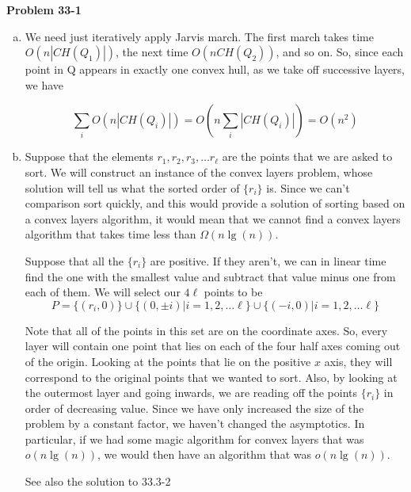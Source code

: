 \documentclass{article}
\begin{document}
\noindent\textbf{Problem 33-1}\\
\begin{enumerate}[a.]
\item
We need just iteratively apply Jarvis march. The first march takes time $O(n|CH(Q_1)|)$, the next time $O(nCH(Q_2))$, and so on. So, since each point in Q appears in exactly one convex hull, as we take off successive layers, we have

\[
\sum_{i} O(n|CH(Q_i)|) = O(n \sum_{i} |CH(Q_i)|) = O(n^2)
\]
\item

Suppose that the elements $r_1,r_2, r_3, \ldots r_\ell$ are the points that we are asked to sort. We will construct an instance of the convex layers problem, whose solution will tell us what the sorted order of $\{r_i\}$ is. Since we can't comparison sort quickly, and this would provide a solution of sorting based on a convex layers algorithm, it would mean that we cannot find a convex layers algorithm that takes time less than $\Omega(n\lg(n))$.

Suppose that all the $\{r_i\}$ are positive. If they aren't, we can in linear time find the one with the smallest value and subtract that value minus one from each of them. We will select our $4\ell$ points to be 
\[
P= \{(r_i,0)\}\cup\{(0,\pm i)|i=1,2,\ldots \ell\}\cup\{(- i,0)|i=1,2,\ldots \ell\}
\]

Note that all of the points in this set are on the coordinate axes. So, every layer will contain one point that lies on each of the four half axes coming out of the origin. Looking at the points that lie on the positive $x$ axis, they will correspond to the original points that we wanted to sort. Also, by looking at the outermost layer and going inwards, we are reading off the points $\{r_i\}$ in order of decreasing value. Since we have only increased the size of the problem by a constant factor, we haven't changed the asymptotics. In particular, if we had some magic algorithm for convex layers that was $o(n\lg(n))$, we would then have an algorithm that was $o(n\lg(n))$.

See also the solution to 33.3-2
\end{enumerate}
\end{document}

